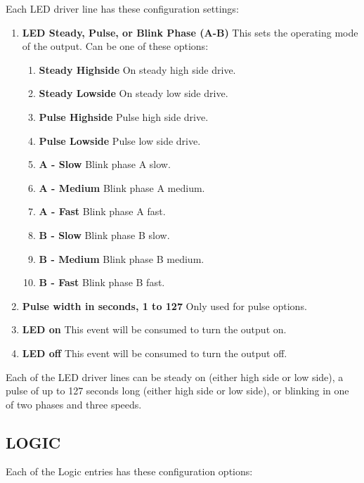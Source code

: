 Each LED driver line has these configuration settings:

\begin{enumerate}
\item \textbf{LED Steady, Pulse, or Blink Phase (A-B)} This sets the operating 
mode of the output.  Can be one of these options:
  \begin{enumerate}
  \item \textbf{Steady Highside} On steady high side drive.
  \item \textbf{Steady Lowside} On steady low side drive.
  \item \textbf{Pulse Highside} Pulse high side drive.
  \item \textbf{Pulse Lowside} Pulse low side drive.
  \item \textbf{A - Slow} Blink phase A slow.
  \item \textbf{A - Medium} Blink phase A medium.
  \item \textbf{A - Fast} Blink phase A fast.
  \item \textbf{B - Slow} Blink phase B slow.
  \item \textbf{B - Medium} Blink phase B medium.
  \item \textbf{B - Fast} Blink phase B fast.
  \end{enumerate}
\item \textbf{Pulse width in seconds, 1 to 127} Only used for pulse options.
\item \textbf{LED on} This event will be consumed to turn the output on.
\item \textbf{LED off} This event will be consumed to turn the output off.
\end{enumerate}

Each of the LED driver lines can be steady on (either high side or low side), 
a pulse of up to 127 seconds long (either high side or low side), or blinking 
in one of two phases and three speeds.

\subsection{LOGIC}

Each of the Logic entries has these configuration options:

